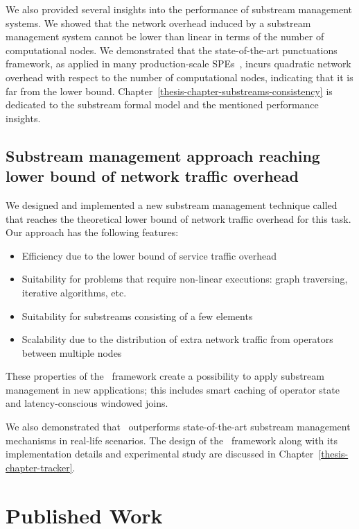 We also provided several insights into the performance of substream management systems. We showed that the network overhead induced by a substream management system cannot be lower than linear in terms of the number of computational nodes. We demonstrated that the state-of-the-art punctuations framework, as applied in many production-scale SPEs~\cite{tucker2003exploiting}, incurs quadratic network overhead with respect to the number of computational nodes, indicating that it is far from the lower bound. Chapter~\ref{thesis-chapter-substreams-consistency} is dedicated to the substream formal model and the mentioned performance insights.

\subsection{Substream management approach reaching lower bound of network traffic overhead}

We designed and implemented a new substream management technique called \tracker~\cite{10.1145/3524860.3539809, trofimov2023bounding} that reaches the theoretical lower bound of network traffic overhead for this task. Our approach has the following features:

\begin{itemize}
    \item Efficiency due to the lower bound of service traffic overhead
    \item Suitability for problems that require non-linear executions: graph traversing, iterative algorithms, etc.
    \item Suitability for substreams consisting of a few elements
    \item Scalability due to the distribution of extra network traffic from operators between multiple nodes
\end{itemize}

These properties of the \tracker\ framework create a possibility to apply substream management in new applications; this includes smart caching of operator state and latency-conscious windowed joins.

We also demonstrated that \tracker\ outperforms state-of-the-art substream management mechanisms in real-life scenarios. The design of the \tracker\ framework along with its implementation details and experimental study are discussed in Chapter~\ref{thesis-chapter-tracker}.

\section{Published Work}


